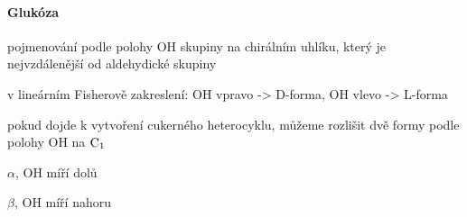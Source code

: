 \documentclass[DIV=8]{scrreprt}
\begin{document}
\paragraph{Glukóza}
\begin{myItemize}[nosep]
    \item pojmenování podle polohy OH skupiny na chirálním uhlíku, který je nejvzdálenější od aldehydické skupiny
\begin{myItemize}[nosep]
    \item v lineárním Fisherově zakreslení: OH vpravo -> D-forma, OH vlevo -> L-forma
\end{myItemize}

    \item pokud dojde k vytvoření cukerného heterocyklu, můžeme rozlišit dvě formy podle polohy OH na \(\ce{C1}\)
\begin{myItemize}[nosep]
    \item \(\alpha\), OH míří dolů
    \item \(\beta\), OH míří nahoru
\end{myItemize}

\end{myItemize}
\end{document}
